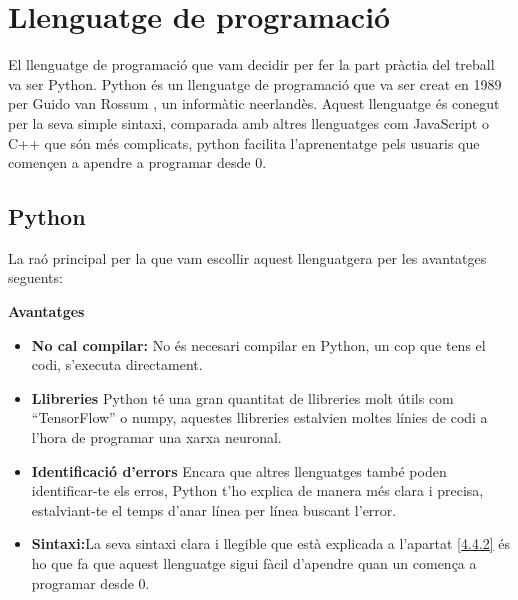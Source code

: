 \section{Llenguatge de programació}\label{sec:4.4}

El llenguatge de programació que vam decidir per fer la part pràctia del treball va ser Python. Python és un llenguatge de programació que va ser creat en 1989 per Guido van Rossum , un informàtic neerlandès. Aquest llenguatge és conegut per la seva simple sintaxi, comparada amb altres llenguatges com JavaScript o C++ que són més complicats, python facilita l'aprenentatge pels usuaris que començen a apendre a programar desde 0.

\subsection{Python}
La raó principal per la que vam escollir aquest llenguatgera per les avantatges seguents:

\textbf{Avantatges}
\begin{itemize}
 \item \textbf{No cal compilar:} No és necesari compilar en Python, un cop que tens el codi, s'executa directament.
 \item \textbf{Llibreries} Python té una gran quantitat de llibreries molt útils com ``TensorFlow'' o numpy, aquestes llibreries estalvien moltes línies de codi a l'hora de programar una xarxa neuronal.
 \item \textbf{Identificació d'errors} Encara que altres llenguatges també poden identificar-te els erros, Python t'ho explica de manera més clara i precisa, estalviant-te el temps d'anar línea per línea buscant l'error.
 \item \textbf{Sintaxi:}La seva sintaxi clara i llegible que està explicada a l'apartat \ref{4.4.2} és ho que fa que aquest llenguatge sigui fàcil d'apendre quan un comença a programar desde 0.
\end{itemize}

